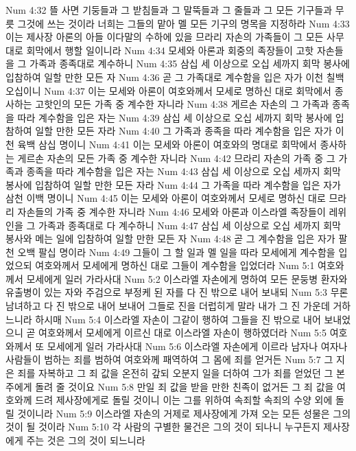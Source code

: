 Num 4:32  뜰 사면 기둥들과 그 받침들과 그 말뚝들과 그 줄들과 그 모든 기구들과 무릇 그것에 쓰는 것이라 너희는 그들의 맡아 멜 모든 기구의 명목을 지정하라
Num 4:33  이는 제사장 아론의 아들 이다말의 수하에 있을 므라리 자손의 가족들이 그 모든 사무대로 회막에서 행할 일이니라
Num 4:34  모세와 아론과 회중의 족장들이 고핫 자손들을 그 가족과 종족대로 계수하니
Num 4:35  삼십 세 이상으로 오십 세까지 회막 봉사에 입참하여 일할 만한 모든 자
Num 4:36  곧 그 가족대로 계수함을 입은 자가 이천 칠백 오십이니
Num 4:37  이는 모세와 아론이 여호와께서 모세로 명하신 대로 회막에서 종사하는 고핫인의 모든 가족 중 계수한 자니라
Num 4:38  게르손 자손의 그 가족과 종족을 따라 계수함을 입은 자는
Num 4:39  삼십 세 이상으로 오십 세까지 회막 봉사에 입참하여 일할 만한 모든 자라
Num 4:40  그 가족과 종족을 따라 계수함을 입은 자가 이천 육백 삼십 명이니
Num 4:41  이는 모세와 아론이 여호와의 명대로 회막에서 종사하는 게르손 자손의 모든 가족 중 계수한 자니라
Num 4:42  므라리 자손의 가족 중 그 가족과 종족을 따라 계수함을 입은 자는
Num 4:43  삼십 세 이상으로 오십 세까지 회막 봉사에 입참하여 일할 만한 모든 자라
Num 4:44  그 가족을 따라 계수함을 입은 자가 삼천 이백 명이니
Num 4:45  이는 모세와 아론이 여호와께서 모세로 명하신 대로 므라리 자손들의 가족 중 계수한 자니라
Num 4:46  모세와 아론과 이스라엘 족장들이 레위인을 그 가족과 종족대로 다 계수하니
Num 4:47  삼십 세 이상으로 오십 세까지 회막 봉사와 메는 일에 입참하여 일할 만한 모든 자
Num 4:48  곧 그 계수함을 입은 자가 팔천 오백 팔십 명이라
Num 4:49  그들이 그 할 일과 멜 일을 따라 모세에게 계수함을 입었으되 여호와께서 모세에게 명하신 대로 그들이 계수함을 입었더라
Num 5:1  여호와께서 모세에게 일러 가라사대
Num 5:2  이스라엘 자손에게 명하여 모든 문둥병 환자와 유출병이 있는 자와 주검으로 부정케 된 자를 다 진 밖으로 내어 보내되
Num 5:3  무론 남녀하고 다 진 밖으로 내어 보내어 그들로 진을 더럽히게 말라 내가 그 진 가운데 거하느니라 하시매
Num 5:4  이스라엘 자손이 그같이 행하여 그들을 진 밖으로 내어 보내었으니 곧 여호와께서 모세에게 이르신 대로 이스라엘 자손이 행하였더라
Num 5:5  여호와께서 또 모세에게 일러 가라사대
Num 5:6  이스라엘 자손에게 이르라 남자나 여자나 사람들이 범하는 죄를 범하여 여호와께 패역하여 그 몸에 죄를 얻거든
Num 5:7  그 지은 죄를 자복하고 그 죄 값을 온전히 갚되 오분지 일을 더하여 그가 죄를 얻었던 그 본주에게 돌려 줄 것이요
Num 5:8  만일 죄 값을 받을 만한 친족이 없거든 그 죄 값을 여호와께 드려 제사장에게로 돌릴 것이니 이는 그를 위하여 속죄할 속죄의 수양 외에 돌릴 것이니라
Num 5:9  이스라엘 자손의 거제로 제사장에게 가져 오는 모든 성물은 그의 것이 될 것이라
Num 5:10  각 사람의 구별한 물건은 그의 것이 되나니 누구든지 제사장에게 주는 것은 그의 것이 되느니라
